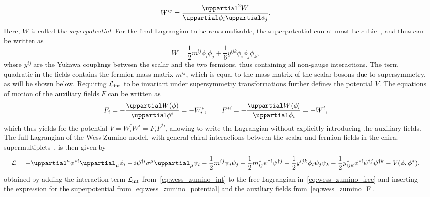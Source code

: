 \begin{equation}
	W^{ij} = \frac{\uppartial^2 W}{\uppartial\phi_i\uppartial\phi_j}. 
\end{equation}
Here, $W$ is called the \textit{superpotential}. For the final Lagrangian to be renormalisable, the superpotential can at most be cubic~\cite{Bustamante:2009us}, and thus can be written as
\begin{equation}
	W = \frac{1}{2}m^{ij}\phi_i \phi_j + \frac{1}{6}y^{ijk}\phi_i \phi_j \phi_k,
	\label{eq:wess_zumino_potential}
\end{equation}
where $y^{ij}$ are the Yukawa couplings between the scalar and the two fermions, thus containing all non-gauge interactions. The term quadratic in the fields contains the fermion mass matrix $m^{ij}$, which is equal to the mass matrix of the scalar bosons due to supersymmetry, as will be shown below. Requiring $\mathcal{L}_\mathrm{int}$ to be invariant under supersymmetry transformations further defines the potential $V$. The equations of motion of the auxiliary fields $F$ can be written as
\begin{equation}
	F_i = -\frac{\uppartial W(\phi)}{\uppartial \phi^i} = - W^*_i, \qquad F^{*i} = - \frac{\uppartial W(\phi)}{\uppartial \phi_i} = - W^i,
	\label{eq:wess_zumino_F}
\end{equation} 
which thus yields for the potential $V = W^*_iW^i = F_iF^{*i}$, allowing to write the Lagrangian without explicitly introducing the auxiliary fields. The full Lagrangian of the Wess-Zumino model, with general chiral interactions between the scalar and fermion fields in the chiral supermultiplets~\cite{Bustamante:2009us}, is then given by
\begin{equation}
	\Lagr = -\uppartial^\mu\phi^{*i}\uppartial_\mu\phi_i - i\psi^{\dagger i}\bar{\sigma}^\mu\uppartial_\mu\psi_i - \frac{1}{2} m^{ij}\psi_i \psi_j - \frac{1}{2} m_{ij}^* \psi^{\dagger i} \psi^{\dagger j} - \frac{1}{2} y^{ijk} \phi_i \psi_j \psi_k - \frac{1}{2} y^*_{ijk} \phi^{*i} \psi^{\dagger j} \psi^{\dagger k} - V(\phi,\phi^*),
	\label{eq:wess_zumino_lagrangian}
\end{equation}
obtained by adding the interaction term $\mathcal{L}_\mathrm{int}$ from~\cref{eq:wess_zumino_int} to the free Lagrangian in~\cref{eq:wess_zumino_free} and inserting the expression for the superpotential from~\cref{eq:wess_zumino_potential} and the auxiliary fields from~\cref{eq:wess_zumino_F}.

